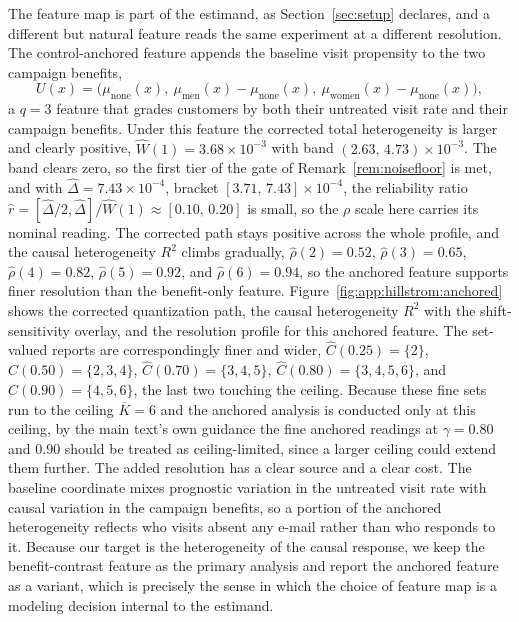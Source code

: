 \documentclass[11pt]{article}
\begin{document}
The feature map is part of the estimand, as Section~\ref{sec:setup} declares, and a different but natural feature reads the same experiment at a different resolution. The control-anchored feature appends the baseline visit propensity to the two campaign benefits,
\[
U(x)=\bigl(\mu_{\mathrm{none}}(x),\ \mu_{\mathrm{men}}(x)-\mu_{\mathrm{none}}(x),\ \mu_{\mathrm{women}}(x)-\mu_{\mathrm{none}}(x)\bigr),
\]
a $q=3$ feature that grades customers by both their untreated visit rate and their campaign benefits. Under this feature the corrected total heterogeneity is larger and clearly positive, $\widehat W(1)=3.68\times10^{-3}$ with band $(2.63,\,4.73)\times10^{-3}$. The band clears zero, so the first tier of the gate of Remark~\ref{rem:noisefloor} is met, and with $\widehat\Delta=7.43\times10^{-4}$, bracket $[3.71,\,7.43]\times10^{-4}$, the reliability ratio $\hat r=[\widehat\Delta/2,\widehat\Delta]/\widehat W(1)\approx[0.10,\,0.20]$ is small, so the $\rho$ scale here carries its nominal reading. The corrected path stays positive across the whole profile, and the causal heterogeneity $R^2$ climbs gradually, $\hat\rho(2)=0.52$, $\hat\rho(3)=0.65$, $\hat\rho(4)=0.82$, $\hat\rho(5)=0.92$, and $\hat\rho(6)=0.94$, so the anchored feature supports finer resolution than the benefit-only feature. Figure~\ref{fig:app:hillstrom:anchored} shows the corrected quantization path, the causal heterogeneity $R^2$ with the shift-sensitivity overlay, and the resolution profile for this anchored feature. The set-valued reports are correspondingly finer and wider, $\widehat C(0.25)=\{2\}$, $\widehat C(0.50)=\{2,3,4\}$, $\widehat C(0.70)=\{3,4,5\}$, $\widehat C(0.80)=\{3,4,5,6\}$, and $\widehat C(0.90)=\{4,5,6\}$, the last two touching the ceiling. Because these fine sets run to the ceiling $\overline K=6$ and the anchored analysis is conducted only at this ceiling, by the main text's own guidance the fine anchored readings at $\gamma=0.80$ and $0.90$ should be treated as ceiling-limited, since a larger ceiling could extend them further. The added resolution has a clear source and a clear cost. The baseline coordinate mixes prognostic variation in the untreated visit rate with causal variation in the campaign benefits, so a portion of the anchored heterogeneity reflects who visits absent any e-mail rather than who responds to it. Because our target is the heterogeneity of the causal response, we keep the benefit-contrast feature as the primary analysis and report the anchored feature as a variant, which is precisely the sense in which the choice of feature map is a modeling decision internal to the estimand.
\end{document}
